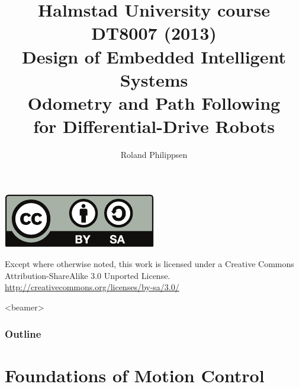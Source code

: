 \documentclass{beamer}
\title[Odometry and Path Following]{%
  \normalsize
  Halmstad University course DT8007 (2013)\\
  Design of Embedded Intelligent Systems\\[2\baselineskip]
  \Large
  \textbf{Odometry and Path Following}\\
  for Differential-Drive Robots}
\author{Roland Philippsen}
\institute{Halmstad University}
\begin{document}
\begin{frame}[plain]
  \titlepage
  \vfill
  \begin{minipage}{\columnwidth}
    \centering
    \begin{minipage}{0.15\columnwidth}
      \includegraphics[width=\columnwidth]{by-sa.pdf}
    \end{minipage}
    \hspace{1mm}
    \begin{minipage}{0.7\columnwidth}
      \tiny
      Except where otherwise noted,
      this work is licensed under a Creative Commons Attribution-ShareAlike 3.0 Unported License.
      \url{http://creativecommons.org/licenses/by-sa/3.0/}
    \end{minipage}
  \end{minipage}
\end{frame}

\begin{frame}<beamer>
  \frametitle{Outline}
  \tableofcontents
\end{frame}


\section{Foundations of Motion Control}
\end{document}
